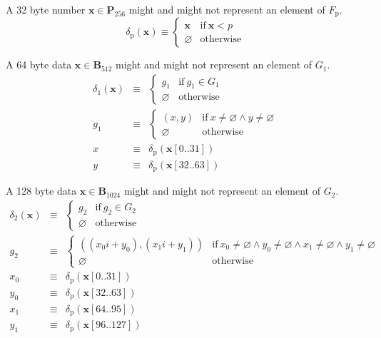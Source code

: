 \documentclass[9pt,oneside]{amsart}
\begin{document}
A 32 byte number $\mathbf{x}\in\mathbf{P}_{256}$ might and might not represent an element of $F_{\mathrm{p}}$.
\begin{equation}
\delta_{\mathrm{p}}(\mathbf x)\equiv\begin{cases}
\mathbf x&\text{if}\ \mathbf x<p\\
\varnothing&\text{otherwise}
\end{cases}
\end{equation}

A 64 byte data $\mathbf x\in\mathbf B_{512}$ might and might not represent an element of $G_1$.
\begin{eqnarray}
\delta_1(\mathbf x)&\equiv&\begin{cases}
g_1&\text{if}\ g_1\in G_1\\
\varnothing&\text{otherwise}
\end{cases}\\
g_1&\equiv&\begin{cases}
(x,y)&\text{if}\ x\neq\varnothing\wedge y\neq\varnothing\\
\varnothing&\text{otherwise}
\end{cases}\\
x&\equiv&\delta_{\mathrm{p}}(\mathbf x[0..31])\\
y&\equiv&\delta_{\mathrm{p}}(\mathbf x[32..63])
\end{eqnarray}

A 128 byte data $\mathbf x\in\mathbf B_{1024}$ might and might not represent an element of $G_2$.
\begin{eqnarray}
\delta_2(\mathbf x)&\equiv&\begin{cases}
g_2&\text{if}\ g_2\in G_2\\
\varnothing&\text{otherwise}
\end{cases}\\
g_2&\equiv&\begin{cases}
((x_0i+y_0),(x_1i+y_1))&\text{if}\ x_0\neq\varnothing\wedge y_0\neq\varnothing\wedge x_1\neq\varnothing\wedge y_1\neq\varnothing\\
\varnothing&\text{otherwise}
\end{cases}\\
x_0&\equiv&\delta_{\mathrm{p}}(\mathbf x[0..31])\\
y_0&\equiv&\delta_{\mathrm{p}}(\mathbf x[32..63])\\
x_1&\equiv&\delta_{\mathrm{p}}(\mathbf x[64..95])\\
y_1&\equiv&\delta_{\mathrm{p}}(\mathbf x[96..127])
\end{eqnarray}
\end{document}
